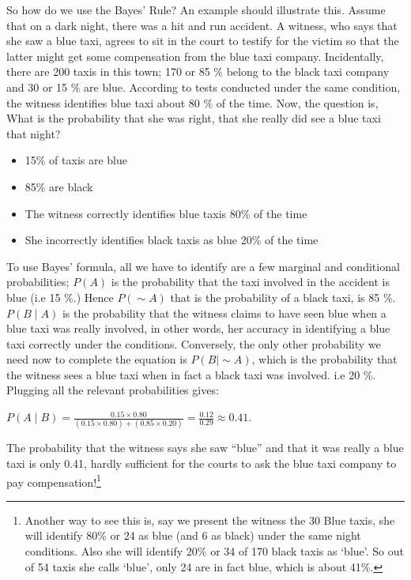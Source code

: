 \documentclass[
  letterpaper,
  DIV=11,
  numbers=noendperiod]{scrreprt}
\providecommand{\tightlist}{%
  \setlength{\itemsep}{0pt}\setlength{\parskip}{0pt}}
\begin{document}
So how do we use the Bayes' Rule? An example should illustrate this.
Assume that on a dark night, there was a hit and run accident. A
witness, who says that she saw a blue taxi, agrees to sit in the court
to testify for the victim so that the latter might get some compensation
from the blue taxi company. Incidentally, there are 200 taxis in this
town; 170 or 85 \% belong to the black taxi company and 30 or 15 \% are
blue. According to tests conducted under the same condition, the witness
identifies blue taxi about 80 \% of the time. Now, the question is, What
is the probability that she was right, that she really did see a blue
taxi that night?

\begin{itemize}
\tightlist
\item
  15\% of taxis are blue\\
\item
  85\% are black\\
\item
  The witness correctly identifies blue taxis 80\% of the time\\
\item
  She incorrectly identifies black taxis as blue 20\% of the time
\end{itemize}

To use Bayes' formula, all we have to identify are a few marginal and
conditional probabilities; \(P(A)\) is the probability that the taxi
involved in the accident is blue (i.e 15 \%.) Hence \(P(\sim A)\) that
is the probability of a black taxi, is 85 \%. \(P(B \mid A)\) is the
probability that the witness claims to have seen blue when a blue taxi
was really involved, in other words, her accuracy in identifying a blue
taxi correctly under the conditions. Conversely, the only other
probability we need now to complete the equation is
\(P(B \mid \sim A)\), which is the probability that the witness sees a
blue taxi when in fact a black taxi was involved. i.e 20 \%. Plugging
all the relevant probabilities gives:

\(P(A \mid B) = \displaystyle \frac{0.15 \times 0.80}{(0.15 \times 0.80) + (0.85 \times 0.20)} = \frac{0.12}{0.29} \approx 0.41\).

The probability that the witness says she saw ``blue'' and that it was
really a blue taxi is only 0.41, hardly sufficient for the courts to ask
the blue taxi company to pay compensation!\footnote{Another way to see
  this is, say we present the witness the 30 Blue taxis, she will
  identify 80\% or 24 as blue (and 6 as black) under the same night
  conditions. Also she will identify 20\% or 34 of 170 black taxis as
  `blue'. So out of 54 taxis she calls `blue', only 24 are in fact blue,
  which is about 41\%.}
\end{document}
